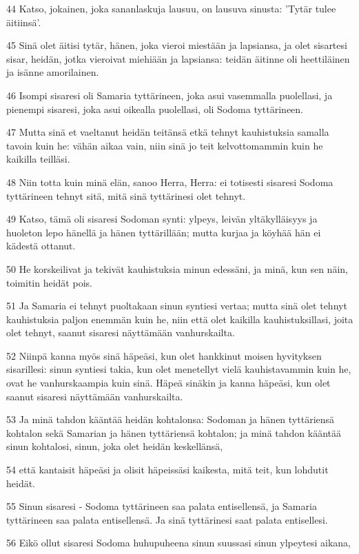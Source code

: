 \par 44 Katso, jokainen, joka sananlaskuja lausuu, on lausuva sinusta: 'Tytär tulee äitiinsä'.
\par 45 Sinä olet äitisi tytär, hänen, joka vieroi miestään ja lapsiansa, ja olet sisartesi sisar, heidän, jotka vieroivat miehiään ja lapsiansa: teidän äitinne oli heettiläinen ja isänne amorilainen.
\par 46 Isompi sisaresi oli Samaria tyttärineen, joka asui vasemmalla puolellasi, ja pienempi sisaresi, joka asui oikealla puolellasi, oli Sodoma tyttärineen.
\par 47 Mutta sinä et vaeltanut heidän teitänsä etkä tehnyt kauhistuksia samalla tavoin kuin he: vähän aikaa vain, niin sinä jo teit kelvottomammin kuin he kaikilla teilläsi.
\par 48 Niin totta kuin minä elän, sanoo Herra, Herra: ei totisesti sisaresi Sodoma tyttärineen tehnyt sitä, mitä sinä tyttärinesi olet tehnyt.
\par 49 Katso, tämä oli sisaresi Sodoman synti: ylpeys, leivän yltäkylläisyys ja huoleton lepo hänellä ja hänen tyttärillään; mutta kurjaa ja köyhää hän ei kädestä ottanut.
\par 50 He korskeilivat ja tekivät kauhistuksia minun edessäni, ja minä, kun sen näin, toimitin heidät pois.
\par 51 Ja Samaria ei tehnyt puoltakaan sinun syntiesi vertaa; mutta sinä olet tehnyt kauhistuksia paljon enemmän kuin he, niin että olet kaikilla kauhistuksillasi, joita olet tehnyt, saanut sisaresi näyttämään vanhurskailta.
\par 52 Niinpä kanna myös sinä häpeäsi, kun olet hankkinut moisen hyvityksen sisarillesi: sinun syntiesi takia, kun olet menetellyt vielä kauhistavammin kuin he, ovat he vanhurskaampia kuin sinä. Häpeä sinäkin ja kanna häpeäsi, kun olet saanut sisaresi näyttämään vanhurskailta.
\par 53 Ja minä tahdon kääntää heidän kohtalonsa: Sodoman ja hänen tyttäriensä kohtalon sekä Samarian ja hänen tyttäriensä kohtalon; ja minä tahdon kääntää sinun kohtalosi, sinun, joka olet heidän keskellänsä,
\par 54 että kantaisit häpeäsi ja olisit häpeissäsi kaikesta, mitä teit, kun lohdutit heidät.
\par 55 Sinun sisaresi - Sodoma tyttärineen saa palata entisellensä, ja Samaria tyttärineen saa palata entisellensä. Ja sinä tyttärinesi saat palata entisellesi.
\par 56 Eikö ollut sisaresi Sodoma huhupuheena sinun suussasi sinun ylpeytesi aikana,
